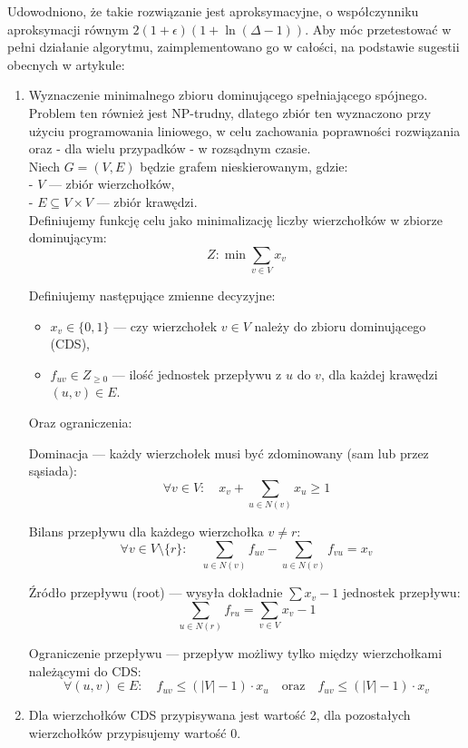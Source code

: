 Udowodniono, że takie rozwiązanie jest aproksymacyjne, o współczynniku aproksymacji równym
$2(1+\epsilon)(1 + \ln(\Delta - 1))$. Aby móc przetestować w pełni działanie algorytmu, zaimplementowano go w całości, na podstawie sugestii obecnych w artykule:

\begin{enumerate}
    \item Wyznaczenie minimalnego zbioru dominującego spełniającego spójnego. Problem ten również jest NP-trudny, dlatego zbiór ten wyznaczono przy użyciu programowania liniowego, w celu zachowania poprawności rozwiązania oraz - dla wielu przypadków - w rozsądnym czasie.\\ 
    Niech \( G = (V, E) \) będzie grafem nieskierowanym, gdzie:\\
        - \( V \) — zbiór wierzchołków,\\
        - \( E \subseteq V \times V \) — zbiór krawędzi.\\

        Definiujemy funkcję celu jako minimalizację liczby wierzchołków w zbiorze dominującym:
        \[
        Z: \min \sum_{v \in V} x_v
        \]

        Definiujemy następujące zmienne decyzyjne:
       
        \begin{itemize}
            \item \( x_v \in \{0, 1\} \) — czy wierzchołek \( v \in V \) należy do zbioru dominującego (CDS),
            \item \( f_{uv} \in {Z}_{\geq 0} \) — ilość jednostek przepływu z \( u \) do \( v \), dla każdej krawędzi \( (u, v) \in E \).
        \end{itemize}

        Oraz ograniczenia:

        Dominacja — każdy wierzchołek musi być zdominowany (sam lub przez sąsiada):
        \[
        \forall v \in V:\quad x_v + \sum_{u \in N(v)} x_u \geq 1
        \]

        Bilans przepływu dla każdego wierzchołka \( v \neq r \):
        \[
        \forall v \in V \setminus \{r\}:\quad \sum_{u \in N(v)} f_{uv} - \sum_{u \in N(v)} f_{vu} = x_v
        \]

        Źródło przepływu (root) — wysyła dokładnie \( \sum x_v - 1 \) jednostek przepływu:
        \[
        \sum_{u \in N(r)} f_{ru} = \sum_{v \in V} x_v - 1
        \]

        Ograniczenie przepływu — przepływ możliwy tylko między wierzchołkami należącymi do CDS:
        \[
        \forall (u, v) \in E:\quad f_{uv} \leq (|V| - 1) \cdot x_u \quad \text{oraz} \quad f_{uv} \leq (|V| - 1) \cdot x_v
        \]
    \item Dla wierzchołków CDS przypisywana jest wartość 2, dla pozostałych wierzchołków przypisujemy wartość 0.
\end{enumerate}


